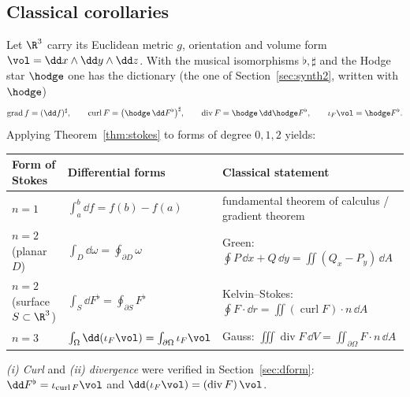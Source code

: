 \subsection{Classical corollaries}\label{sec:classical}

Let $\R^3$ carry its Euclidean metric $g$, orientation and volume form $\vol=\dd x\wedge\dd y\wedge\dd z$. With the musical isomorphisms $\flat,\sharp$ and the Hodge star $\hodge$ one has the dictionary (the one of Section~\ref{sec:synth2}, written with $\hodge$)
\[
\operatorname{grad}f=(\dd f)^\sharp,\qquad
\operatorname{curl}F=\bigl(\hodge\,\dd F^\flat\bigr)^\sharp,\qquad
\operatorname{div}F=\hodge\,\dd\hodge F^\flat,\qquad
\iota_F\vol=\hodge F^\flat .
\]
Applying Theorem~\ref{thm:stokes} to forms of degree $0,1,2$ yields:

\begin{center}
\small
\renewcommand{\arraystretch}{1.4}
\begin{tabular}{@{}p{2.5cm}p{4.5cm}p{7.0cm}@{}}
\toprule
\textbf{Form of Stokes} & \textbf{Differential forms} & \textbf{Classical statement}\\
\midrule
$n=1$ & $\int_a^b\dd f=f(b)-f(a)$ & fundamental theorem of calculus / gradient theorem\\
$n=2$ (planar $D$) & $\int_D\dd\omega=\oint_{\partial D}\omega$ & Green: $\oint P\,\dd x+Q\,\dd y=\iint(Q_x-P_y)\,\dd A$\\
$n=2$ (surface $S\subset\R^3$) & $\int_S\dd F^\flat=\oint_{\partial S}F^\flat$ & Kelvin--Stokes: $\oint F\cdot\dd r=\iint(\operatorname{curl}F)\cdot n\,\dd A$\\
$n=3$ & $\int_\Omega\dd(\iota_F\vol)=\int_{\partial\Omega}\iota_F\vol$ & Gauss: $\iiint\operatorname{div}F\,\dd V=\iint_{\partial\Omega}F\cdot n\,\dd A$\\
\bottomrule
\end{tabular}
\end{center}

\emph{(i) Curl} and \emph{(ii) divergence} were verified in Section~\ref{sec:dform}: $\dd F^\flat=\iota_{\operatorname{curl}F}\vol$ and
$\dd(\iota_F\vol)=(\operatorname{div}F)\,\vol$.


